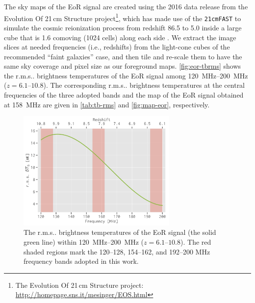\documentclass[modern]{aastex62}
\makeatletter
\newcommand{\rms}{r.m.s\@ifnextchar.{}{.\@}}
\makeatother
\begin{document}
The sky maps of the EoR signal are created using the 2016 data release
from the Evolution Of 21\,cm Structure project\footnote{%
  The Evolution Of 21\,cm Structure project:
  \url{http://homepage.sns.it/mesinger/EOS.html}},
which has made use of the \texttt{21cmFAST} to simulate the cosmic
reionization process from redshift 86.5 to 5.0 inside a large cube that is
1.6 comoving \si{\Gpc} (1024 cells) along each side \citep{mesinger2016}.
We extract the image slices at needed frequencies (i.e., redshifts) from
the light-cone cubes of the recommended \enquote{faint galaxies} case,
and then tile and re-scale them to have the same sky coverage and
pixel size as our foreground maps.
\autoref{fig:eor-tbrms} shows the \rms{} brightness temperatures of the
EoR signal among \SIrange{120}{200}{\MHz} ($z = \numrange{6.1}{10.8}$).
The corresponding \rms{} brightness temperatures at the central
frequencies of the three adopted bands and the map of the EoR signal
obtained at \SI{158}{\MHz} are given in \autoref{tab:tb-rms} and
\autoref{fig:map-eor}, respectively.

\begin{figure}
  \centering
  \includegraphics[width=0.7\textwidth]{eos2016-tbrms}
  \caption{\label{fig:eor-tbrms}%
    The \rms{} brightness temperatures of the EoR signal
    (the solid green line) within \SIrange{120}{200}{\MHz}
    ($z = \numrange{6.1}{10.8}$).
    The red shaded regions mark the \numrange{120}{128},
    \numrange{154}{162}, and \numrange{192}{200} \si{\MHz}
    frequency bands adopted in this work.
  }
\end{figure}
\end{document}
